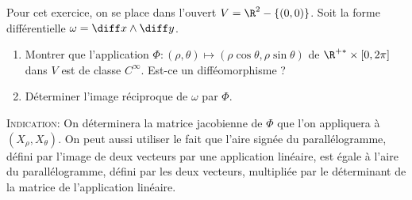 \begin{exercice}
Pour cet exercice, on se place dans l'ouvert $V = \R^2-\{(0,0)\}$. Soit la forme différentielle $\omega = \diff x \wedge \diff y$.
\begin{enumerate}
\item Montrer que l'application $\Phi \colon (\rho,\theta) \mapsto (\rho \cos \theta, \rho \sin \theta )$ de $\R^{+*}\times [0,2\pi]$ dans $V$ est de classe $C^\infty$. Est-ce un difféomorphisme ?
\item Déterminer l'image réciproque de $\omega$ par $\Phi$. 
\end{enumerate}

\textsc{Indication}: On déterminera la matrice jacobienne de $\Phi$ que l'on appliquera à $(X_\rho, X_\theta)$. On peut aussi utiliser le fait que l'aire signée du parallélogramme, défini par l'image de deux vecteurs par une application linéaire, est égale à l'aire du parallélogramme, défini par les deux vecteurs, multipliée par le déterminant de la matrice de l'application linéaire.
\end{exercice}

